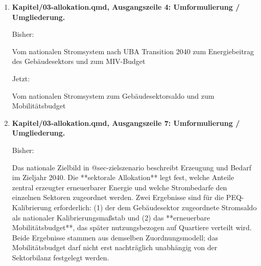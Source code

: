 \documentclass[
  ngerman,
  a4paper,
  DIV=11]{scrreprt}
\newenvironment{Shaded}{\begin{snugshade}}{\end{snugshade}}
\newcommand{\NormalTok}[1]{\textcolor[rgb]{0.00,0.23,0.31}{#1}}
\begin{document}
\begin{enumerate}
\begin{Shaded}
\begin{Highlighting}[]
\NormalTok{::: \{.callout{-}note title="Historische Einordnung"\}}
\NormalTok{Die ursprüngliche PEQ{-}Zielwertableitung beruhte auf „Energieautarkie für Österreich 2050“ nach Streicher et al. und der darauf aufbauenden sektoralen Allokation [@streicher2010energieautarkie; @schneider2020lokal; @schneider2023context]. Sie ist für die vorliegende Neukalibrierung **kein konkurrierendes Referenzszenario**. Die vollständige historische Parametrisierung gehört in den Methodenanhang.}
\NormalTok{:::}
\end{Highlighting}
\end{Shaded}

  Jetzt:

\begin{Shaded}
\begin{Highlighting}[]
\NormalTok{Die historische Ableitung nach Streicher et al. bildet den methodischen Ausgangspunkt; das Referenzszenario dieses Entwurfs ist Transition 2040 [@streicher2010energieautarkie; @schneider2020lokal; @schneider2023context].}
\end{Highlighting}
\end{Shaded}
\item
  \textbf{Kapitel/03-allokation.qmd, Ausgangszeile 4: Umformulierung /
  Umgliederung.}

  Bisher:

\begin{Shaded}
\begin{Highlighting}[]
\NormalTok{Vom nationalen Stromsystem nach UBA Transition 2040 zum Energiebeitrag des Gebäudesektors und zum MIV{-}Budget}
\end{Highlighting}
\end{Shaded}

  Jetzt:

\begin{Shaded}
\begin{Highlighting}[]
\NormalTok{Vom nationalen Stromsystem zum Gebäudesektorsaldo und zum Mobilitätsbudget}
\end{Highlighting}
\end{Shaded}
\item
  \textbf{Kapitel/03-allokation.qmd, Ausgangszeile 7: Umformulierung /
  Umgliederung.}

  Bisher:

\begin{Shaded}
\begin{Highlighting}[]
\NormalTok{Das nationale Zielbild in @sec{-}zielszenario beschreibt Erzeugung und Bedarf im Zieljahr 2040. Die **sektorale Allokation** legt fest, welche Anteile zentral erzeugter erneuerbarer Energie und welche Strombedarfe den einzelnen Sektoren zugeordnet werden. Zwei Ergebnisse sind für die PEQ{-}Kalibrierung erforderlich: (1) der dem Gebäudesektor zugeordnete Stromsaldo als nationaler Kalibrierungsmaßstab und (2) das **erneuerbare Mobilitätsbudget**, das später nutzungsbezogen auf Quartiere verteilt wird. Beide Ergebnisse stammen aus demselben Zuordnungsmodell; das Mobilitätsbudget darf nicht erst nachträglich unabhängig von der Sektorbilanz festgelegt werden.}
\end{Highlighting}
\end{Shaded}


\end{enumerate}
\end{document}
